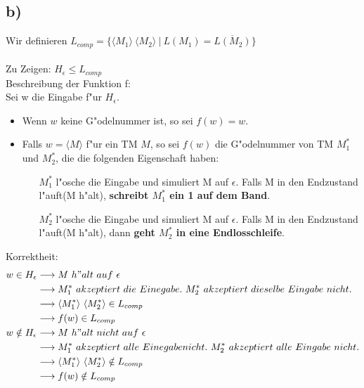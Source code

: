 \documentclass[a4paper,11pt]{scrartcl}
\begin{document}
\subsection*{b)}
	Wir definieren $L_{comp} = \{ \langle M_1 \rangle\ \langle M_2 \rangle \ |\ L(M_1) = \overline{L(M_2)}\}$
	\\ \ \\
	Zu Zeigen: $H_\epsilon \leq L_{comp}$\\
	Beschreibung der Funktion f:\\
	Sei w die Eingabe f"ur $H_\epsilon$.
	\begin{itemize}
		\item Wenn $w$ keine G"odelnummer ist, so sei $f(w) = w$.
		\item Falls $w = \langle M \rangle$ f"ur ein TM $M$, so sei $f(w)$ die G"odelnummer von TM $M^*_1$ und $M^*_2$, die die folgenden Eigenschaft haben:
		 \begin{itemize}
		 	\item[$M^*_1$] l"osche die Eingabe und simuliert M auf $\epsilon$. Falls M in den Endzustand l"auft(M h"alt), \textbf{schreibt $M^*_1$ ein 1 auf dem Band}.
		 	\item[$M^*_2$] l"osche die Eingabe und simuliert M auf $\epsilon$. Falls M in den Endzustand l"auft(M h"alt), dann \textbf{geht $M^*_2$ in eine Endlosschleife}.
		 \end{itemize}

	\end{itemize}

	Korrektheit:\\
	\begin{align*}
		w\in H_\epsilon &\longrightarrow M\ h"alt\ auf\ \epsilon \\
		&\longrightarrow M^*_1\ akzeptiert\ die\ Einegabe.\ M^*_2\ akzeptiert\ dieselbe\ Eingabe\ nicht.\\
		&\longrightarrow \langle M^*_1 \rangle\ \langle M^*_2 \rangle \in L_{comp}\\
		&\longrightarrow f(w) \in L_{comp}\\		
		w\notin H_\epsilon &\longrightarrow M\ h"alt\ nicht\ auf\ \epsilon \\
		&\longrightarrow  M^*_1\ akzeptiert\ alle\ Einegabe nicht.\ M^*_2\ akzeptiert\ alle\ Eingabe\ nicht.\\
		&\longrightarrow \langle M^*_1 \rangle\ \langle M^*_2 \rangle \notin L_{comp}\\
		&\longrightarrow f(w) \notin L_{comp}\\		
	\end{align*}
\end{document}
